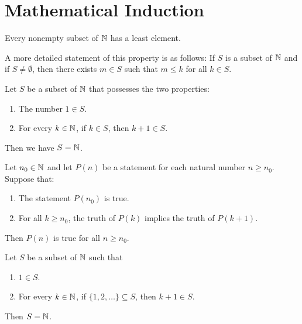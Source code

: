 \section{Mathematical Induction}

\begin{theorem}
	Every nonempty subset of $\mathbb{N}$ has a least element.
\end{theorem}
A more detailed statement of this property is as follows: If $S$ is a subset of $\mathbb{N}$ and if $S \neq \emptyset$, then there exists $m \in S$ such that $m \leq k$ for all $k \in S$.

\begin{theorem}
	Let $S$ be a subset of $\mathbb{N}$ that possesses the two properties:
	\begin{enumerate}
		\item The number $1 \in S$.
		\item For every $k \in \mathbb{N}$, if $k \in S$, then $k + 1 \in S$.
	\end{enumerate}
	Then we have $S = \mathbb{N}$.
\end{theorem}

\begin{theorem}
	Let $n_0 \in \mathbb{N}$ and let $P(n)$ be a statement for each natural number $n \geq n_0$. Suppose that:
	\begin{enumerate}
		\item The statement $P(n_0)$ is true.

		\item For all $k \geq n_0$, the truth of $P(k)$ implies the truth of $P(k+1)$.
	\end{enumerate}
	Then $P(n)$ is true for all $n \geq n_0$.
\end{theorem}

\begin{theorem}
	Let $S$ be a subset of $\mathbb{N}$ such that
	\begin{enumerate}
		\item $1 \in S$.

		\item For every $k \in \mathbb{N}$, if $\{1, 2, \dots \} \subseteq S$, then $k+1 \in S$.
	\end{enumerate}
	Then $S = \mathbb{N}$.
\end{theorem}
